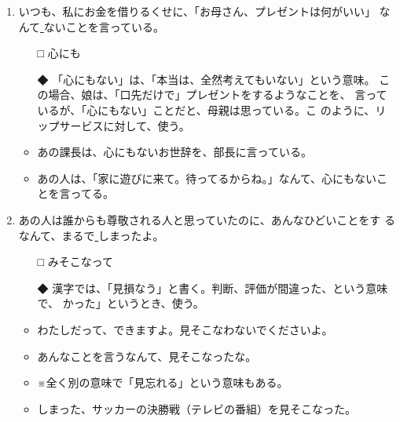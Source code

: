 \documentclass[
uplatex,
b5paper,
10pt,
dvipdfmx
]{jsbook}
\begin{document}
\begin{enumerate}
\item いつも、私にお金を借りるくせに、「お母さん、プレゼントは何がいい」
      なんて\underline{   }ないことを言っている。

\begin{itemize}
\item[□] 心にも
\item[◆] 「心にもない」は、「本当は、全然考えてもいない」という意味。
	  この場合、娘は、「口先だけで」プレゼントをするようなことを、
	  言っているが、「心にもない」ことだと、母親は思っている。こ
	  のように、リップサービスに対して、使う。 
\end{itemize}
\begin{itemize}
\item あの課長は、心にもないお世辞を、部長に言っている。
\item あの人は、「家に遊びに来て。待ってるからね。」なんて、心にもないこ
      とを言ってる。
\end{itemize}

\item あの人は誰からも尊敬される人と思っていたのに、あんなひどいことをす
      るなんて、まるで\underline{   }しまったよ。

\begin{itemize}
\item[□] みそこなって
\item[◆] 漢字では、「見損なう」と書く。判断、評価が間違った、という意味で、
	  かった」というとき、使う。 
\end{itemize}
\begin{itemize}
\item わたしだって、できますよ。見そこなわないでくださいよ。
\item あんなことを言うなんて、見そこなったな。
\item ※全く別の意味で「見忘れる」という意味もある。
\item しまった、サッカーの決勝戦（テレビの番組）を見そこなった。 
\end{itemize}
\end{enumerate}
\end{document}
